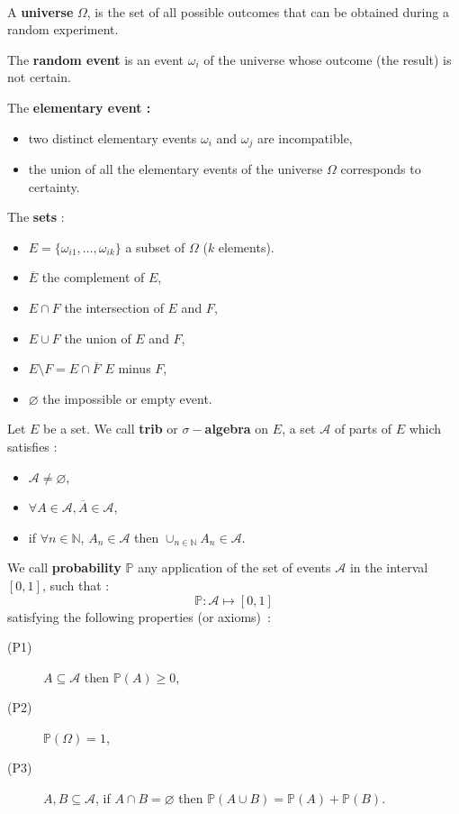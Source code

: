 
\begin{f}[Axiomatic]{\ }
	
	A \textbf{universe} \(\Omega\), is the set of all possible outcomes that can be obtained during a random experiment.
	
	The \textbf{random event} is an event \(\omega_i\) of the universe whose outcome (the result) is not certain.
	
	
	The \textbf{elementary event :}
	\begin{itemize}
		\item two distinct elementary events \(\omega_i\) and \(\omega_j\) are incompatible,
		\item the union of all the elementary events of the universe \(\Omega \) corresponds to certainty.
	\end{itemize}
	
	The \textbf{sets} :
	\begin{itemize}
		\item \(E=\lbrace \omega_{i1},\ldots , \omega_{ik}\rbrace\) a subset of \(\Omega\) (\(k\) elements).
		\item \(\overline{E}\) the complement of \(E\),
		\item \(E\cap F\) the intersection of \(E\) and \(F\),
		\item \(E\cup F\) the union of \(E\) and \(F\),
		\item \(E\setminus F= E\cap\overline{F}\) \(E\) minus \(F\),
		\item \(\varnothing\) the impossible or empty event.
	\end{itemize}
	
	Let \(E\) be a set. We call \textbf{trib} or \textbf{\(\sigma-\)algebra} on \(E\), a set \(\mathcal{A}\) of parts of \(E\) which satisfies :
	\begin{itemize}
		\item     \(\mathcal{A} \not=\varnothing\),
		\item     \(\forall A \in \mathcal{A} , \overline{A} \in\mathcal{A}\),
		\item     if \(\forall n \in \mathbb{N}\), \(A_n \in\mathcal{A}\) then \(\cup_{n\in\mathbb{N} } A_n \in\mathcal{A}\).
	\end{itemize}
	
	We call \textbf{probability} \(\mathbb{P}\) any application of the set of events \(\mathcal{A}\) in the interval \([0,1]\), such that :      \[\mathbb{P} :      \mathcal{A}  \mapsto   [0,1]\]
	satisfying the following properties (or axioms)~:
	\begin{description}
		\item[(P1)] \(A \subseteq \mathcal{A} \)    then  \( \mathbb{P}(A) \geq 0\),
		\item[(P2)] \( \mathbb{P}(\Omega) = 1\),
		\item[(P3)] \(A, B \subseteq \mathcal{A}\),  if  \(A\cap B =\varnothing\)    then   \(\mathbb{P}(A\cup B)=\mathbb{P}(A) + \mathbb{P}(B)\).
	\end{description}
	

\end{f}
